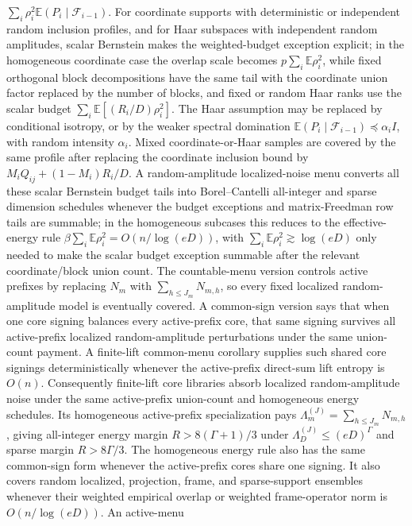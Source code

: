 \documentclass[11pt]{article}
\begin{document}
\(\sum_i\rho_i^2\mathbb E(P_i\mid\mathcal{F}_{i-1})\).
For coordinate supports with deterministic or independent random inclusion
profiles, and for Haar subspaces with independent random amplitudes, scalar
Bernstein makes the weighted-budget exception explicit; in the homogeneous
coordinate case the overlap scale becomes \(p\sum_i\mathbb E\rho_i^2\), while
fixed orthogonal block decompositions have the same tail with the coordinate
union factor replaced by the number of blocks, and
fixed or random Haar ranks use the scalar budget
\(\sum_i\mathbb E[(R_i/D)\rho_i^2]\).  The Haar assumption may be replaced by
conditional isotropy, or by the weaker spectral domination
\(\mathbb E(P_i\mid\mathcal F_{i-1})\preceq\alpha_iI\), with random intensity
\(\alpha_i\).  Mixed
coordinate-or-Haar samples are
covered by the same profile after replacing the coordinate inclusion bound by
\(M_iQ_{ij}+(1-M_i)R_i/D\).  A random-amplitude localized-noise menu converts
all these scalar Bernstein budget tails into Borel--Cantelli all-integer and
sparse dimension schedules whenever the budget exceptions and matrix-Freedman
row tails are summable; in the homogeneous subcases this reduces to the
effective-energy rule \(\beta\sum_i\mathbb E\rho_i^2=O(n/\log(eD))\), with
\(\sum_i\mathbb E\rho_i^2\gtrsim\log(eD)\) only needed to make the scalar
budget exception summable after the relevant coordinate/block union count.
The countable-menu version controls active prefixes by replacing \(N_m\) with
\(\sum_{h\le J_m}N_{m,h}\), so every fixed localized random-amplitude model is
eventually covered.
A common-sign version says that when one core signing balances every
active-prefix core, that same signing survives all active-prefix localized
random-amplitude perturbations under the same union-count payment.
A finite-lift common-menu corollary supplies such shared core signings
deterministically whenever the active-prefix direct-sum lift entropy is \(O(n)\).
Consequently finite-lift core libraries absorb localized random-amplitude noise
under the same active-prefix union-count and homogeneous energy schedules.
Its homogeneous active-prefix specialization pays
\(\Lambda_m^{(J)}=\sum_{h\le J_m}N_{m,h}\), giving all-integer energy margin
\(R>8(\Gamma+1)/3\) under \(\Lambda_D^{(J)}\le(eD)^\Gamma\) and sparse margin
\(R>8\Gamma/3\).
The homogeneous energy rule also has the same common-sign form whenever the
active-prefix cores share one signing.
It also covers random localized,
projection, frame, and sparse-support ensembles whenever their weighted empirical
overlap or weighted frame-operator norm is \(O(n/\log(eD))\).  An active-menu
\end{document}
